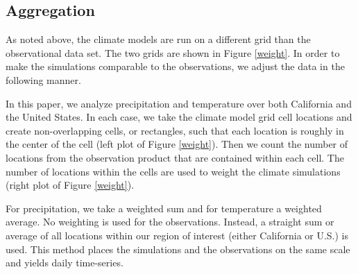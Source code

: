 \subsection{Aggregation}
\label{aggregate}


As noted above, the climate models are run on a different grid than the observational data set. The two grids are shown in Figure \ref{weight}. In order to make the simulations comparable to the observations, we adjust the data in the following manner.

In this paper, we analyze precipitation and temperature over both California and the United States. In each case, we take the climate model grid cell locations and create non-overlapping cells, or rectangles, such that each location is roughly in the center of the cell (left plot of Figure \ref{weight}). Then we count the number of locations from the observation product that are contained within each cell. The number of locations within the cells are used to weight the climate simulations (right plot of Figure \ref{weight}).

For precipitation, we take a weighted sum and for temperature a weighted average. No weighting is used for the observations. Instead, a straight sum or average of all locations within our region of interest (either California or U.S.) is used. This method places the simulations and the observations on the same scale and yields daily time-series.

